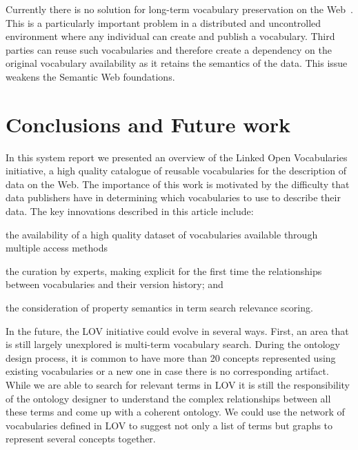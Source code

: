 \documentclass{iosart2c}
\begin{document}
Currently there is no solution for long-term vocabulary preservation on the Web~\cite{Baker2013HLT}. This is a particularly important problem in a distributed and uncontrolled environment where any individual can create and publish a vocabulary. Third parties can reuse such vocabularies and therefore create a dependency on the original vocabulary availability as it retains the semantics of the data. This issue weakens the Semantic Web foundations. 




\section{Conclusions and Future work}
\label{sec:conclusion}

In this system report we presented an overview of the Linked Open Vocabularies initiative, a high quality catalogue of reusable vocabularies for the description of data on the Web. The importance of this work is motivated by the difficulty that data publishers have in determining which vocabularies to use to describe their data. The key innovations described in this article include: 
\begin{inparaenum}[1)] 
	\item the availability of a high quality dataset of vocabularies available through multiple access methods 
	\item the curation by experts, making explicit  for the first time the relationships between vocabularies and their version history; and
	\item the consideration of property semantics in term search relevance scoring.
\end{inparaenum}

In the future, the LOV initiative could evolve in several ways. First, an area that is still largely unexplored is multi-term vocabulary search. During the ontology design process, it is common to have more than 20 concepts represented using existing vocabularies or a new one in case there is no corresponding artifact. While we are able to search for relevant terms in LOV it is still the responsibility of the ontology designer to understand the complex relationships between all these terms and come up with a coherent ontology. We could use the network of vocabularies defined in LOV to suggest not only a list of terms but graphs to represent several concepts together. 
\end{document}
